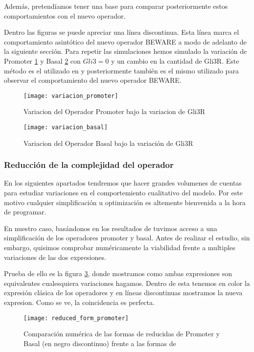Además, pretendíamos tener una base para comparar posteriormente estos comportamientos con el nuevo operador.

Dentro las figuras se puede apreciar una línea discontinua. Esta línea marca el comportamiento asintótico del nuevo operador BEWARE a modo de adelanto de la siguiente sección. 
Para repetir las simulaciones hemos simulado la variación de Promoter \ref{varipro} y Basal \ref{varibas} con $Gli3=0$ y un cambio en la cantidad de Gli3R. Este método es el utilizado en \cite{schaffer} y posteriormente también es el mismo utilizado para observar el comportamiento del nuevo operador BEWARE.

 \begin{figure}[h]
 	\texttt{[image: variacion\_promoter]}
 	\centering
 	\caption{Variacion del Operador Promoter bajo la variacion de Gli3R }
 	\label{varipro}
 \end{figure}

\begin{figure}[h]
	\texttt{[image: variacion\_basal]}
	\centering
	\caption{Variacion del Operador Basal bajo la variación de Gli3R }
	\label{varibas}
\end{figure}

\subsubsection{Reducción de la complejidad del operador}

En los siguientes apartados tendremos que hacer grandes volumenes de cuentas para estudiar variaciones en el comportemiento cualitativo del modelo. Por este motivo cualquier simplificación u optimización es altemente bienvenida a la hora de programar. 

En nuestro caso, basándonos en los resultados de \cite{multiple} tuvimos acceso a una simplificación de los operadores promoter y basal. Antes de realizar el estudio, sin embargo, quisimos comprobar numéricamente la viabilidad frente a multiples variaciones de las dos expresiones. 

Prueba de ello es la figura \ref{compara}, donde mostramos como ambas expresiones son equivalentes cualesquiera variaciones hagamos. Dentro de esta tenemos en color la expresión clásica de los operadores y en líneas discontinuas mostramos la nueva expresion. Como se ve, la coincidencia es perfecta. 

\begin{figure}[h]
	\texttt{[image: reduced\_form\_promoter]}
	\centering
	\caption{Comparación numérica de las formas de reducidas de Promoter y Basal (en negro discontinuo) frente a las formas de \cite{schaffer} }
	\label{compara}
\end{figure}


